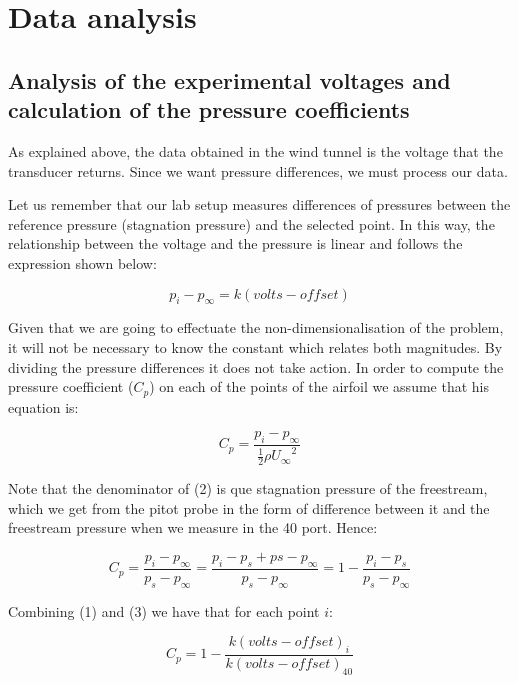 \documentclass[10pt]{SelfArx} %
\begin{document}

\section{Data analysis}

\subsection{Analysis of the experimental voltages and calculation of the pressure coefficients}

As explained above, the data obtained in the wind tunnel is the voltage that the transducer returns. Since we want pressure differences, we must process our data.

Let us remember that our lab setup measures differences of pressures between the reference pressure (stagnation pressure) and the selected point. In this way, the relationship between the voltage and the pressure is linear and follows the expression shown below: 

\begin{equation} p_{i} - p_{\infty} = k (volts - offset) \end{equation}

Given that we are going to effectuate the non-dimensionalisation of the problem, it will not be necessary to know the constant which relates both magnitudes. By dividing the pressure differences it does not take action. In order to compute the pressure coefficient ($C_{p}$) on each of the points of the airfoil we assume that his equation is: 

\begin{equation} C_{p} = \frac{p_{i} - p_{\infty}}{\frac{1}{2} \rho {U_{\infty}}^{2}} \end{equation}

Note that the denominator of (2) is que stagnation pressure of the freestream, which we get from the pitot probe in the form of difference between it and the freestream pressure when we measure in the 40 port. Hence:

\begin{equation} C_{p} = \frac{p_{i} - p_{\infty}}{p_{s} - p_{\infty}} = \frac{p_{i} - p_{s} + p{s} - p_{\infty}}{p_{s} - p_{\infty}} = 1 - \frac{p_{i} - p_{s}}{p_{s} - p_{\infty}} \end{equation}


Combining (1) and (3) we have that for each point $i$:

\begin{equation} C_{p} = 1 - \frac{k (volts - offset)_{i}}{k (volts - offset)_{40}} \end{equation}
 
\end{document}
